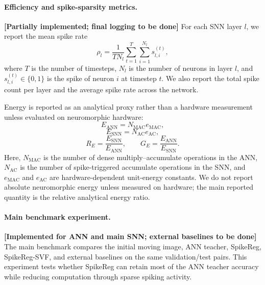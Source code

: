 \paragraph{Efficiency and spike-sparsity metrics.}
\textbf{[Partially implemented; final logging to be done]} For each SNN layer \(l\), we report the mean spike rate
\begin{equation}
\rho_l
=
\frac{1}{T N_l}
\sum_{t=1}^{T}
\sum_{i=1}^{N_l}
s_{l,i}^{(t)},
\end{equation}
where \(T\) is the number of timesteps, \(N_l\) is the number of neurons in layer \(l\), and \(s_{l,i}^{(t)} \in \{0,1\}\) is the spike of neuron \(i\) at timestep \(t\). We also report the total spike count per layer and the average spike rate across the network.

Energy is reported as an analytical proxy rather than a hardware measurement unless evaluated on neuromorphic hardware:
\begin{equation}
E_{\mathrm{ANN}}
=
N_{\mathrm{MAC}} e_{\mathrm{MAC}},
\end{equation}
\begin{equation}
E_{\mathrm{SNN}}
=
N_{\mathrm{AC}} e_{\mathrm{AC}},
\end{equation}
\begin{equation}
R_E
=
\frac{E_{\mathrm{SNN}}}{E_{\mathrm{ANN}}},
\qquad
G_E
=
\frac{E_{\mathrm{ANN}}}{E_{\mathrm{SNN}}}.
\end{equation}
Here, \(N_{\mathrm{MAC}}\) is the number of dense multiply--accumulate operations in the ANN, \(N_{\mathrm{AC}}\) is the number of spike-triggered accumulate operations in the SNN, and \(e_{\mathrm{MAC}}\) and \(e_{\mathrm{AC}}\) are hardware-dependent unit-energy constants. We do not report absolute neuromorphic energy unless measured on hardware; the main reported quantity is the relative analytical energy ratio.

\paragraph{Main benchmark experiment.}
\textbf{[Implemented for ANN and main SNN; external baselines to be done]} The main benchmark compares the initial moving image, ANN teacher, SpikeReg, SpikeReg-SVF, and external baselines on the same validation/test pairs. This experiment tests whether SpikeReg can retain most of the ANN teacher accuracy while reducing computation through sparse spiking activity.


